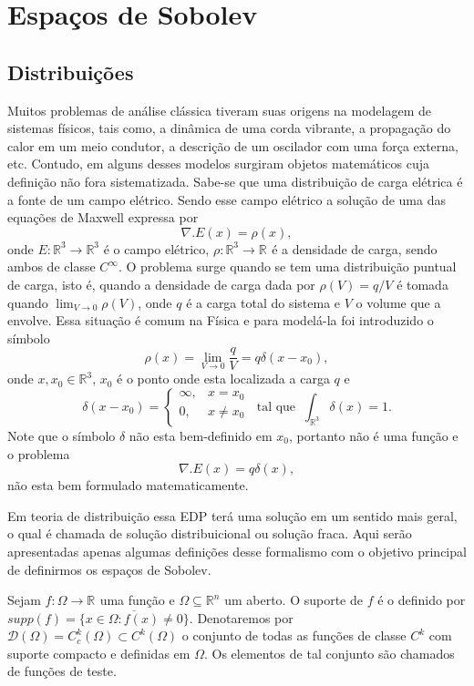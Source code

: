 \documentclass[12pt]{book}
\newcommand{\funcaocond}[5]{
	#1 = 
	\left\{
	\begin{array}{cc}
		#2, & #3\\
		#4, & #5\\
	\end{array}
	\right.
}
\newcommand{\funcoesdiferenciaveis}[2]{C^{#1}(#2)}
\newcommand{\funcoesdiferenciaveissupp}[2]{C^{#1}_{c}(#2)}
\newcommand{\funcoesteste}{\mathcal{D}(\Omega)}
\newcommand{\real}[1]{\mathbb{R}^{#1}}
\newcommand{\reta}{\real{}}
\begin{document}
	
	\chapter{Espaços de Sobolev}
	\section{Distribuições}\label{secao_distribuicoes}
	Muitos problemas de análise clássica tiveram suas origens na modelagem de sistemas físicos, tais como, a dinâmica de uma corda vibrante, a propagação do calor em um meio condutor, a descrição de um oscilador com uma força externa, etc. Contudo, em alguns desses modelos surgiram objetos matemáticos cuja definição não fora sistematizada. Sabe-se que uma distribuição de carga elétrica é a fonte de um campo elétrico. Sendo esse campo elétrico a solução de uma das equações de Maxwell expressa por
	$$
	\nabla.E(x) = \rho(x),
	$$
	onde $E:\real{3} \to \real{3}$ é o campo elétrico, $\rho:\real{3}\to \reta$ é a densidade de carga, sendo ambos de classe $C^{\infty}$. O problema surge quando se tem uma distribuição puntual de carga, isto é, quando a densidade de carga dada por $\rho(V) = q/V$ é tomada quando $\lim_{V \to 0}\rho(V)$, onde $q$ é a carga total do sistema e $V$ o volume que a envolve. Essa situação é comum na Física e para modelá-la foi introduzido o símbolo
	$$
	\rho(x) = \lim_{V\to 0} \frac{q}{V} = q\delta(x - x_{0}),
	$$
	onde $x,x_{0} \in \real{3}$, $x_{0}$ é o ponto onde esta localizada a carga $q$ e 
	$$
	\funcaocond{\delta(x - x_{0})}{\infty}{x=x_{0}}{0}{x\neq x_{0}}\;\; \text{tal que} \;\; \int_{\real{3}} \delta(x) = 1.
	$$
	Note que o símbolo $\delta$ não esta bem-definido em $x_{0}$, portanto não é uma função e o problema 
	$$
	\nabla.E(x) = q\delta(x),
	$$
	não esta bem formulado matematicamente. 
	
	Em teoria de distribuição essa EDP terá uma solução em um sentido mais geral, o qual é chamada de solução distribuicional ou solução fraca. Aqui serão apresentadas apenas algumas definições desse formalismo com o objetivo principal de definirmos os espaços de Sobolev.
	
	Sejam $f:\Omega\to \reta$ uma função e $\Omega \subseteq \real{n}$ um aberto. O suporte de $f$ é o definido por $supp(f) = \overline{\{ x\in \Omega: f(x)\neq 0 \}}$. Denotaremos por $\funcoesteste=\funcoesdiferenciaveissupp{k}{\Omega} \subset \funcoesdiferenciaveis{k}{\Omega}$ o conjunto de todas as funções de classe $C^{k}$ com suporte compacto e definidas em $\Omega$. Os elementos de tal conjunto são chamados de funções de teste.
	
\end{document}
